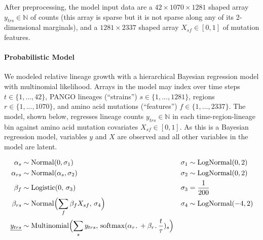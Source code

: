 \documentclass[12pt]{article}
\newcommand \blank {{\,\pmb\cdot\,}}
\begin{document}
After preprocessing, the model input data are a $42 \times 1070 \times 1281$ shaped array $y_{trs}\in\mathbb N$ of counts (this array is sparse but it is not sparse along any of its 2-dimensional marginals), and a $1281 \times 2337$ shaped array $X_{sf}\in[0,1]$ of mutation features.

\paragraph*{Probabilistic Model}

% 

We modeled relative lineage growth with a hierarchical Bayesian regression model with multinomial likelihood.
Arrays in the model may index over time steps $t\in \{1,\dots,42\}$, PANGO lineages (``strains'') $s\in\{1,\dots,1281\}$, regions $r\in\{1,...,1070\}$, and amino acid mutations (``features'') $f\in\{1,\dots,2337\}$.
The model, shown below, regresses lineage counts $y_{trs}\in\mathbb N$ in each time-region-lineage bin against amino acid mutation covariates $X_{sf} \in [0,1]$.
As this is a Bayesian regression model, variables $y$ and $X$ are observed and all other variables in the model are latent.

\begin{align*}
  \textstyle
  \alpha_s &\sim \operatorname{Normal}(0, \sigma_1) &
  \sigma_1 &\sim \operatorname{LogNormal}(0, 2) \\
  \alpha_{rs} &\sim \operatorname{Normal}(\alpha_s, \sigma_2) &
  \sigma_2 &\sim \operatorname{LogNormal}(0, 2) \\
  \beta_f &\sim \operatorname{Logistic}(0,\, \sigma_3) &
  \sigma_3 &= \frac{1}{200} \\
  \beta_{rs} &\sim \operatorname{Normal}\Bigl(
   \sum_f \beta_f X_{sf},\, \sigma_4
  \Bigr) &
  \sigma_4 &\sim \operatorname{LogNormal}(-4, 2) \\
  \underline{y_{trs}} &\sim \operatorname{Multinomial}\Bigl(
    \sum_s y_{trs},\, \operatorname{softmax}(\alpha_{r\blank} + \beta_{r\blank}\frac t\tau)_s
  \Bigr)
\end{align*}
\end{document}
